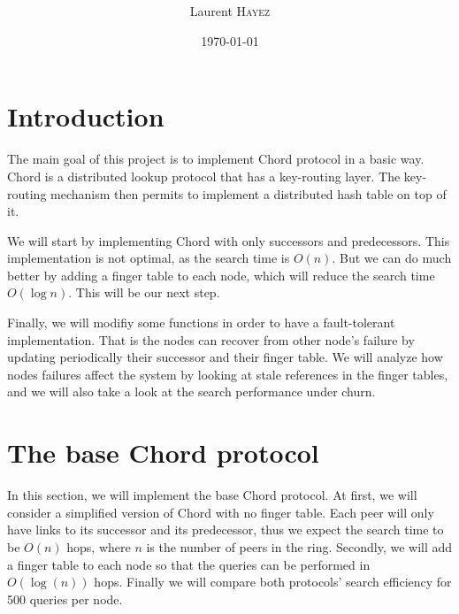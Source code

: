 \documentclass[a4paper, 11pt]{article}
\title{%
  \normalfont{\bfseries{\rule{\linewidth}{2pt} Large-Scale Distributed Systems\\Project 2: Distributed Hash Tables\\ %
    \vspace{-0.4cm}  \rule{\linewidth}{2pt}}}
  }
\author{Laurent \textsc{Hayez}}
\date{\today}
\theoremstyle{plain}
\theoremstyle{definition}
\begin{document}
\renewcommand{\proofname}{{\scshape Proof}}
\renewcommand{\labelitemi}{\textbullet}


\maketitle

\renewcommand{\contentsname}{Table of contents}
\tableofcontents



\section{Introduction}
\label{sec:introduction}
  
  The main goal of this project is to implement Chord protocol in a basic way. Chord is a distributed lookup
  protocol that has a key-routing layer. The key-routing mechanism then permits to implement a distributed
  hash table on top of it. 

  We will start by implementing Chord with only successors and predecessors. This implementation is not
  optimal, as the search time is $O(n)$. But we can do much better by adding a finger table to each node,
  which will reduce the search time $O(\log n)$. This will be our next step.

  Finally, we will modifiy some functions in order to have a fault-tolerant implementation. That is the nodes
  can recover from other node's failure by updating periodically their successor and their finger table. We
  will analyze how nodes failures affect the system by looking at stale references in the finger tables, and
  we will also take a look at the search performance under churn.



\section{The base Chord protocol}
\label{sec:base-chord-protocol}

  In this section, we will implement the base Chord protocol. At first, we will consider a simplified version
  of Chord with no finger table. Each peer will only have links to its successor and its predecessor, thus we
  expect the search time to be $O(n)$ hops, where $n$ is the number of peers in the ring. Secondly, we will add a
  finger table to each node so that the queries can be performed in $O(\log(n))$ hops. Finally we will compare
  both protocols' search efficiency for 500 queries per node.
\end{document}
